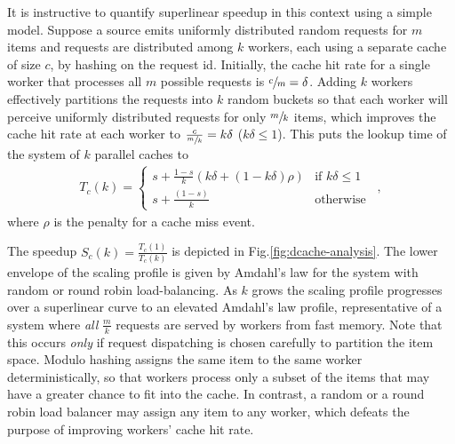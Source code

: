 

It is instructive to quantify superlinear speedup in this context using a simple model. Suppose a source emits uniformly distributed random requests for $m$ items and requests are distributed among $k$ workers, each using a separate cache of size $c$, by hashing on the request id.  Initially, the cache hit rate for a single worker that processes all $m$ possible requests is $\sfrac{c}{m}=\delta$. Adding $k$ workers effectively partitions the requests into $k$ random buckets so that each worker will perceive uniformly distributed requests for only $\sfrac{m}{k}$ items, which improves the cache hit rate at each worker to $\frac{c}{\sfrac{m}{k}} = k\delta$ ($k\delta \le 1$). This puts the lookup time of the system of $k$ parallel caches to
\begin{align}\label{eq:dist-cache}
  T_c(k) = \begin{cases} s + \frac{1-s}{k}(k\delta + (1-k\delta)\rho) & \text{if } k\delta \le 1\\s + \frac{(1-s)}{k} & \text{otherwise}\end{cases} \enspace ,
\end{align}
where $\rho$ is the penalty for a cache miss event.

The speedup $S_c(k)=\frac{T_c(1)}{T_c(k)}$ is depicted in Fig.\ref{fig:dcache-analysis}. The lower envelope of the scaling profile is given by Amdahl's law for the system with random or round robin load-balancing. %
As $k$ grows the scaling profile progresses over a superlinear curve to an elevated Amdahl's law profile, representative of a system where \emph{all} $\frac{m}{k}$ requests are served by workers from fast memory. %
Note that this occurs \emph{only} if request dispatching is chosen carefully to partition the item space. Modulo hashing assigns the same item to the same worker deterministically, so that workers process only a subset of the items that may have a greater chance to fit into the cache. In contrast, a random or a round robin load balancer may assign any item to any worker, which defeats the purpose of improving workers' cache hit rate. %

